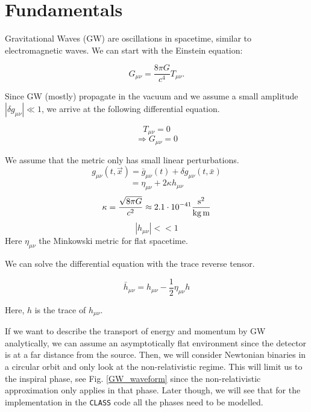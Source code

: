 \section{Fundamentals}
Gravitational Waves (GW) are oscillations in spacetime, similar to electromagnetic
waves. We can start with the Einstein equation:

\begin{equation}
    G_{\mu\nu}= \frac{8\pi G}{c^4} T_{\mu\nu}.
\end{equation}

Since GW (mostly) propagate in the vacuum and we assume a small amplitude $|\delta g_{\mu\nu}| \ll 1$, we arrive at the following differential equation.

\begin{equation}
    T_{\mu\nu} = 0
\end{equation}
\begin{equation}
    \Rightarrow G_{\mu\nu} = 0
\end{equation}


We assume that the metric only has small linear perturbations. 
\begin{equation}
    g_{\mu \nu}(t, \vec{x}) = \bar{g}_{\mu \nu}(t) + \delta g_{\mu \nu}(t, \bar{x})
\end{equation}
\begin{equation}
   = \eta_{\mu \nu} + 2\kappa h_{\mu \nu}
\end{equation}
\begin{equation}
    \kappa = \frac{\sqrt{8\pi G}}{c^2} \approx 2.1 \cdot 10^{-41}\frac{\rm{s}^2}{\rm{kg}\,\rm{ m}}
\end{equation}
\begin{equation}
    |h_{\mu \nu}| << 1
\end{equation}
Here $\eta_{ \mu \nu}$ the Minkowski metric for flat spacetime.

We can solve the differential equation with the trace reverse tensor.

\begin{equation}
    \bar{h}_{\mu\nu} = h_{\mu\nu}-\frac{1}{2} \eta_{\mu\nu}h
\end{equation}

Here, $h$ is the trace of $h_{\mu\nu}$.

If we want to describe the transport of energy and momentum by GW analytically, we can assume an asymptotically flat environment since the detector is at a far distance from the source. Then, we will consider Newtonian binaries in a circular orbit and only look at the non-relativistic regime. This will limit us to the inspiral phase, see Fig. \ref{GW_waveform} since the non-relativistic approximation only applies in that phase. Later though, we will see that for the implementation in the {\tt CLASS} code all the phases need to be modelled.

